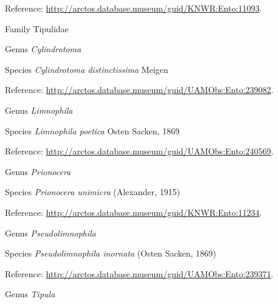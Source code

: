 \documentclass[9pt, article]{memoir}
\begin{document}
\begin{multicols}{2}
\vspace{6pt}Reference: 
\url{http://arctos.database.museum/guid/KNWR:Ento:11093}.

\vspace{6pt}\noindent\hspace{24pt}Family Tipulidae


\vspace{6pt}\noindent\hspace{30pt}Genus \textit{Cylindrotoma}


\vspace{6pt}\noindent\hspace{36pt}Species \textit{Cylindrotoma distinctissima} Meigen


\vspace{6pt}Reference: 
\url{http://arctos.database.museum/guid/UAMObs:Ento:239082}.

\vspace{6pt}\noindent\hspace{30pt}Genus \textit{Limnophila}


\vspace{6pt}\noindent\hspace{36pt}Species \textit{Limnophila poetica} Osten Sacken, 1869


\vspace{6pt}Reference: 
\url{http://arctos.database.museum/guid/UAMObs:Ento:240569}.

\vspace{6pt}\noindent\hspace{30pt}Genus \textit{Prionocera}


\vspace{6pt}\noindent\hspace{36pt}Species \textit{Prionocera unimicra} (Alexander, 1915)


\vspace{6pt}Reference: 
\url{http://arctos.database.museum/guid/KNWR:Ento:11234}.

\vspace{6pt}\noindent\hspace{30pt}Genus \textit{Pseudolimnophila}


\vspace{6pt}\noindent\hspace{36pt}Species \textit{Pseudolimnophila inornata} (Osten Sacken, 1869)


\vspace{6pt}Reference: 
\url{http://arctos.database.museum/guid/UAMObs:Ento:239371}.

\vspace{6pt}\noindent\hspace{30pt}Genus \textit{Tipula}



\end{multicols}
\end{document}
